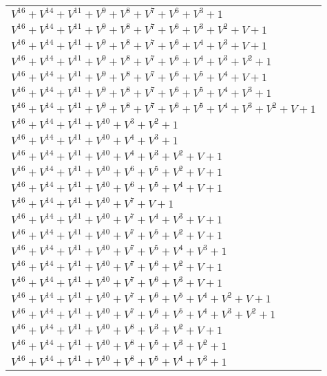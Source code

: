 \documentclass[12pt]{article}
\begin{document}
\begin{adjustwidth}{-4cm}{}
\begin{center}
\begin{longtable}{|l|}
$V^{16}  +V^{14}  +V^{11}  +V^{9}  +V^{8}  +V^{7}  +V^{6}  +V^{3}  + 1$ \\
$V^{16}  +V^{14}  +V^{11}  +V^{9}  +V^{8}  +V^{7}  +V^{6}  +V^{3}  +V^{2}  + V + 1$ \\
$V^{16}  +V^{14}  +V^{11}  +V^{9}  +V^{8}  +V^{7}  +V^{6}  +V^{4}  +V^{3}  + V + 1$ \\
$V^{16}  +V^{14}  +V^{11}  +V^{9}  +V^{8}  +V^{7}  +V^{6}  +V^{4}  +V^{3}  +V^{2}  + 1$ \\
$V^{16}  +V^{14}  +V^{11}  +V^{9}  +V^{8}  +V^{7}  +V^{6}  +V^{5}  +V^{4}  + V + 1$ \\
$V^{16}  +V^{14}  +V^{11}  +V^{9}  +V^{8}  +V^{7}  +V^{6}  +V^{5}  +V^{4}  +V^{3}  + 1$ \\
$V^{16}  +V^{14}  +V^{11}  +V^{9}  +V^{8}  +V^{7}  +V^{6}  +V^{5}  +V^{4}  +V^{3}  +V^{2}  + V + 1$ \\
$V^{16}  +V^{14}  +V^{11}  +V^{10}  +V^{3}  +V^{2}  + 1$ \\
$V^{16}  +V^{14}  +V^{11}  +V^{10}  +V^{4}  +V^{3}  + 1$ \\
$V^{16}  +V^{14}  +V^{11}  +V^{10}  +V^{4}  +V^{3}  +V^{2}  + V + 1$ \\
$V^{16}  +V^{14}  +V^{11}  +V^{10}  +V^{6}  +V^{5}  +V^{2}  + V + 1$ \\
$V^{16}  +V^{14}  +V^{11}  +V^{10}  +V^{6}  +V^{5}  +V^{4}  + V + 1$ \\
$V^{16}  +V^{14}  +V^{11}  +V^{10}  +V^{7}  + V + 1$ \\
$V^{16}  +V^{14}  +V^{11}  +V^{10}  +V^{7}  +V^{4}  +V^{3}  + V + 1$ \\
$V^{16}  +V^{14}  +V^{11}  +V^{10}  +V^{7}  +V^{5}  +V^{2}  + V + 1$ \\
$V^{16}  +V^{14}  +V^{11}  +V^{10}  +V^{7}  +V^{5}  +V^{4}  +V^{3}  + 1$ \\
$V^{16}  +V^{14}  +V^{11}  +V^{10}  +V^{7}  +V^{6}  +V^{2}  + V + 1$ \\
$V^{16}  +V^{14}  +V^{11}  +V^{10}  +V^{7}  +V^{6}  +V^{3}  + V + 1$ \\
$V^{16}  +V^{14}  +V^{11}  +V^{10}  +V^{7}  +V^{6}  +V^{5}  +V^{4}  +V^{2}  + V + 1$ \\
$V^{16}  +V^{14}  +V^{11}  +V^{10}  +V^{7}  +V^{6}  +V^{5}  +V^{4}  +V^{3}  +V^{2}  + 1$ \\
$V^{16}  +V^{14}  +V^{11}  +V^{10}  +V^{8}  +V^{3}  +V^{2}  + V + 1$ \\
$V^{16}  +V^{14}  +V^{11}  +V^{10}  +V^{8}  +V^{5}  +V^{3}  +V^{2}  + 1$ \\
$V^{16}  +V^{14}  +V^{11}  +V^{10}  +V^{8}  +V^{5}  +V^{4}  +V^{3}  + 1$ \\

\end{longtable}
\end{center}
\end{adjustwidth}
\end{document}
